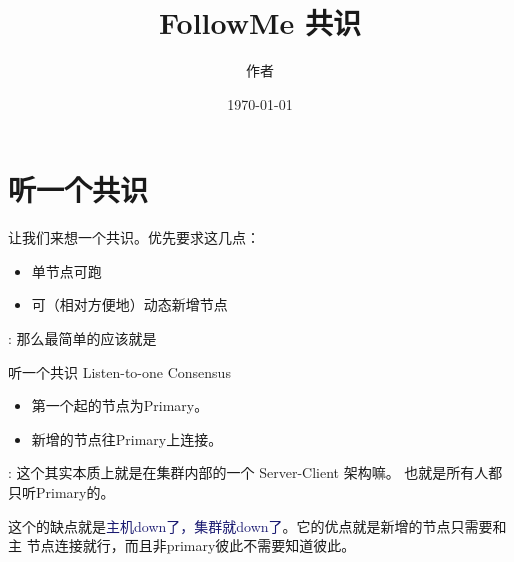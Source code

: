 \documentclass[dvipsnames]{ctexart}
\title{FollowMe 共识}
\date{\today}
\author{作者}
\newcommand{\mycola}{MidnightBlue}
\newcommand{\cola}[1]{\textcolor{\mycola}{#1}}
\begin{document}
\maketitle

\section{听一个共识}
让我们来想一个共识。优先要求这几点：
\begin{itemize}
\item 单节点可跑
\item 可（相对方便地）动态新增节点
\end{itemize}
 : 那么最简单的应该就是
\begin{myBox}{听一个共识 Listen-to-one Consensus}
  \label{cons-a}
  \begin{itemize}
  \item 第一个起的节点为Primary。
  \item 新增的节点往Primary上连接。
  \end{itemize}
\end{myBox}

 : 这个其实本质上就是在集群内部的一个 Server-Client 架构嘛。
也就是所有人都只听Primary的。
\begin{center}
\end{center}
这个的缺点就是\cola{主机down了，集群就down了}。它的优点就是新增的节点只需要和主
节点连接就行，而且非primary彼此不需要知道彼此。

\end{document}
